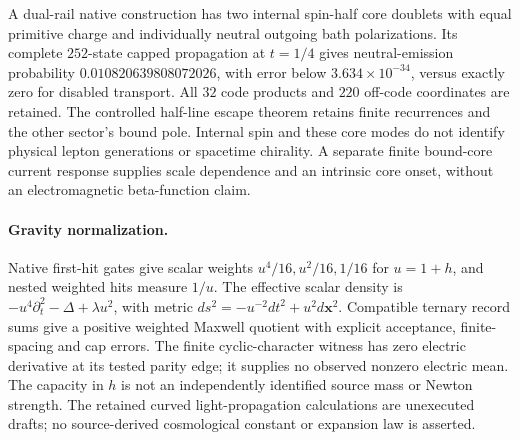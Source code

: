 A dual-rail native construction has two internal spin-half core doublets
with equal primitive charge and individually neutral outgoing bath
polarizations. Its complete $252$-state capped propagation at $t=1/4$
gives neutral-emission probability $0.010820639808072026$, with error
below $3.634\times10^{-34}$, versus exactly zero for disabled transport.
All $32$ code products and $220$ off-code coordinates are retained. The
controlled half-line escape theorem retains finite recurrences and the
other sector's bound pole. Internal spin and these core modes do not
identify physical lepton generations or spacetime chirality. A separate
finite bound-core current response supplies scale dependence and an
intrinsic core onset, without an electromagnetic beta-function claim.

\paragraph{Gravity normalization.}
Native first-hit gates give scalar weights $u^4/16,u^2/16,1/16$ for
$u=1+h$, and nested weighted hits measure $1/u$. The effective scalar
density is $-u^4\partial_t^2-\Delta+\lambda u^2$, with metric
$ds^2=-u^{-2}dt^2+u^2d\mathbf x^2$.
Compatible ternary record sums give a positive weighted Maxwell quotient
with explicit acceptance, finite-spacing and cap errors. The finite
cyclic-character witness has zero electric derivative at its tested
parity edge; it supplies no observed nonzero electric mean. The capacity
in $h$ is not an independently identified source mass or Newton strength.
The retained curved light-propagation calculations are unexecuted drafts;
no source-derived cosmological constant or expansion law is asserted.
